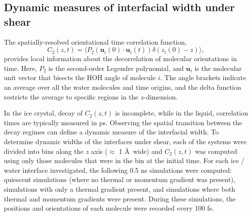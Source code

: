 \subsection{Dynamic measures of interfacial width under shear}
The spatially-resolved orientational time correlation function,
\begin{equation}\label{C(t)1}
  C_{2}(z,t)=\langle P_{2}(\mathbf{u}_i(0)\cdot \mathbf{u}_i(t))
  \delta(z_i(0) - z) \rangle,
\end{equation}
provides local information about the decorrelation of molecular
orientations in time. Here, $P_{2}$ is the second-order Legendre
polynomial, and $\mathbf{u}_i$ is the molecular unit vector that bisects
the HOH angle of molecule $i$. The angle brackets indicate an average
over all the water molecules and time origins, and the delta function
restricts the average to specific regions in the $z$-dimension. 

In the ice crystal, decay of $C_2(z,t)$ is incomplete, while in the
liquid, correlation times are typically measured in ps. Observing the
spatial transition between the decay regimes can define a dynamic
measure of the interfacial width. To determine dynamic widths of the
interfaces under shear, each of the systems were divided into bins
along the $z$ axis ($\approx$ 1 \AA\ wide) and $C_2(z,t)$ was computed
using only those molecules that were in the bin at the initial
time. For each ice / water interface investigated, the following 0.5
ns simulations were computed: quiescent simulations (where no thermal
or momentum gradient was present), simulations with only a thermal
gradient present, and simulations where both thermal and momentum
gradients were present. During these simulations, the positions and
orientations of each molecule were recorded every 100 fs.

